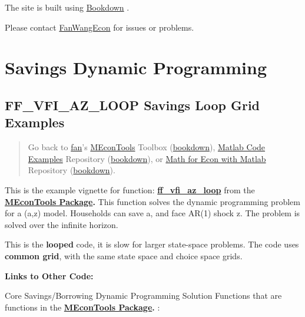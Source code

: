 \documentclass[
]{book}
\begin{document}
The site is built using \href{https://bookdown.org/}{Bookdown} \citep{R-bookdown}.

Please contact \href{https://fanwangecon.github.io/}{FanWangEcon} for issues or problems.

\hypertarget{savings-dynamic-programming}{%
\chapter{Savings Dynamic Programming}\label{savings-dynamic-programming}}

\hypertarget{ff_vfi_az_loop-savings-loop-grid-examples}{%
\section{FF\_VFI\_AZ\_LOOP Savings Loop Grid Examples}\label{ff_vfi_az_loop-savings-loop-grid-examples}}

\begin{quote}
Go back to \href{http://fanwangecon.github.io/}{fan}'s \href{https://fanwangecon.github.io/MEconTools/}{MEconTools} Toolbox (\href{https://fanwangecon.github.io/MEconTools/bookdown}{bookdown}), \href{https://fanwangecon.github.io/M4Econ/}{Matlab Code Examples} Repository (\href{https://fanwangecon.github.io/M4Econ/bookdown}{bookdown}), or \href{https://fanwangecon.github.io/Math4Econ/}{Math for Econ with Matlab} Repository (\href{https://fanwangecon.github.io/Math4Econ/bookdown}{bookdown}).
\end{quote}

This is the example vignette for function:
\href{https://github.com/FanWangEcon/MEconTools/blob/master/MEconTools/vfi/ff_vfi_az_loop.m}{\textbf{ff\_vfi\_az\_loop}}
from the \href{https://fanwangecon.github.io/MEconTools/}{\textbf{MEconTools
Package}}\textbf{.} This function
solves the dynamic programming problem for a (a,z) model. Households can
save a, and face AR(1) shock z. The problem is solved over the infinite
horizon.

This is the \textbf{looped} code, it is slow for larger state-space problems.
The code uses \textbf{common grid}, with the same state space and choice
space grids.

\textbf{Links to Other Code:}

Core Savings/Borrowing Dynamic Programming Solution Functions that are
functions in the \href{https://fanwangecon.github.io/MEconTools/}{\textbf{MEconTools
Package}}\textbf{.} :
\end{document}
